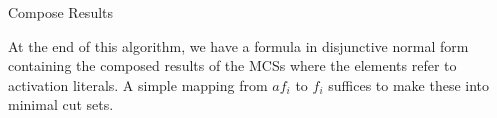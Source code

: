 \begin{algorithm}[h]

	


	\caption{Compose Results}
	\label{alg:compose}
\end{algorithm}




At the end of this algorithm, we have a formula in disjunctive normal form containing the composed results of the MCSs where the elements refer to activation literals. A simple mapping from $af_i$ to $f_i$ suffices to make these into minimal cut sets. 









